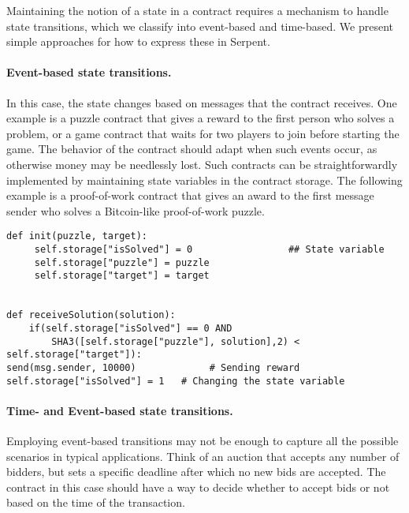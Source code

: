 \documentclass[10pt,twocolumn,letterpaper]{article}
\begin{document}
Maintaining the notion of a state in a contract requires a mechanism to handle state transitions, which we classify into event-based and time-based. We present simple approaches for how to express these in Serpent.

\paragraph{Event-based state transitions.}

In this case, the state changes based on messages that the contract receives. One example is a puzzle contract that gives a reward to the first person who solves a problem, or a game contract that waits for two players to join before starting the game. The behavior of the contract should adapt when such events occur, as otherwise money may be needlessly lost. Such contracts can be straightforwardly implemented by maintaining state variables in the contract storage. The following example is a proof-of-work contract that gives an award to the first message sender who solves a Bitcoin-like proof-of-work puzzle.

\begin{mdframed}
\begin{verbatim}
def init(puzzle, target):
     self.storage["isSolved"] = 0                 ## State variable
     self.storage["puzzle"] = puzzle
     self.storage["target"] = target           
 

def receiveSolution(solution):
    if(self.storage["isSolved"] == 0 AND 
    	SHA3([self.storage["puzzle"], solution],2) < self.storage["target"]):
send(msg.sender, 10000)             # Sending reward
self.storage["isSolved"] = 1   # Changing the state variable
\end{verbatim}
\end{mdframed}




\paragraph{Time- and Event-based state transitions.}
Employing event-based transitions may not be enough to capture all the possible scenarios in typical applications. Think of an auction that accepts any number of bidders, but sets a specific deadline after which no new bids are accepted. The contract in this case should have a way to decide whether to accept bids or not based on the time of the transaction.
\end{document}
